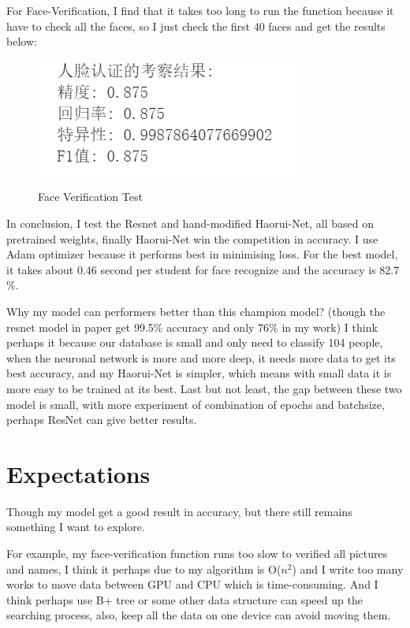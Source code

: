 \documentclass{article}
\begin{document}
For Face-Verification, I find that it takes too long to run the function because it have to check all the faces, so I just check the first 40 faces and get the results below:
\begin{figure}[H]%
  \centering
  \caption{Face Verification Test}
  \includegraphics[width=40ex]{IMG/人脸认证.png} %
  \label{Fig.RNN} %
\end{figure}

In conclusion, I test the Resnet and hand-modified Haorui-Net, all based on pretrained weights, finally Haorui-Net win the competition in accuracy. I use Adam optimizer because it performs best in minimising loss. For the best model, it takes about 0.46 second per student for face recognize and the accuracy is 82.7 $\%$.

Why my model can performers better than this champion model? (though the resnet model in paper get 99.5$\%$ accuracy and only 76$\%$ in my work) I think perhaps it because our database is small and only need to classify 104 people, when the neuronal network is more and more deep, it needs more data to get its best accuracy, and my Haorui-Net is simpler, which means with small data it is more easy to be trained at its best. Last but not least, the gap between these two model is small, with more experiment of combination of epochs and batchsize, perhaps ResNet can give better results.

\section{Expectations}
Though my model get a good result in accuracy, but there still remains something I want to explore.

For example, my face-verification function runs too slow to verified all pictures and names, I think it perhaps due to my  algorithm is O($n^2$) and I write too many works to move data between GPU and CPU which is time-consuming. And I think perhaps use B+ tree or some other data structure can speed up the searching process, also, keep all the data on one device can avoid moving them.
\end{document}
